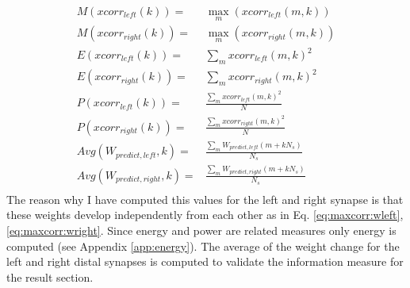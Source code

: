 \begin{eqnarray}
M(xcorr_{left}(k))=& \max\limits_{m}(xcorr_{left}(m,k)) \label{eq.maxcorr:mleft}\\
M(xcorr_{right}(k))=& \max\limits_{m}(xcorr_{right}(m,k)) \label{eq.maxcorr:mright}\\
E(xcorr_{left}(k))=& \sum\limits_{m} xcorr_{left}(m,k)^2  \\ 
E(xcorr_{right}(k))=& \sum\limits_{m} xcorr_{right}(m,k)^2 \\ 
P(xcorr_{left}(k))=& \frac{\sum\limits_{m} xcorr_{left}(m,k)^2}{N} \\
P(xcorr_{right}(k))=& \frac{\sum\limits_{m} xcorr_{right}(m,k)^2}{N} \\
Avg(W_{predict,left},k)=&\frac{\sum\limits_{m} W_{predict,left}(m+k N_{s})}{N_{s}} \\
Avg(W_{predict,right},k)=& \frac{\sum\limits_{m} W_{predict,right}(m+k N_{s})}{N_{s}} \\ 
\end{eqnarray}
The reason why I have computed this values for the left and right synapse is that
these weights develop independently from each other as in Eq. \ref{eq:maxcorr:wleft},\ref{eq:maxcorr:wright}.
Since energy and power are related measures only energy is computed (see Appendix \ref{app:energy}).
The average of the weight change for the left and right distal synapses is computed
 to validate the information measure for the result section.

